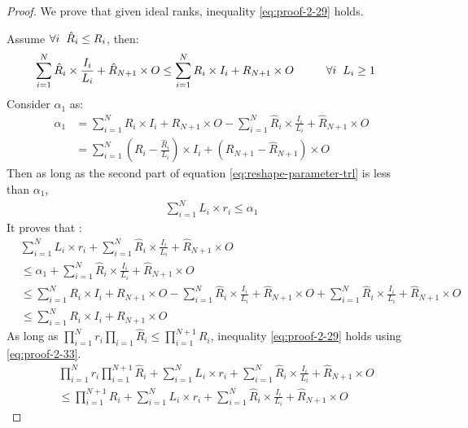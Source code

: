 \documentclass{article}
\begin{document}
\begin{proof}
	We prove that given ideal ranks, inequality \ref{eq:proof-2-29} holds. 
	
	Assume $\forall i \hspace{2mm}\hat{R}_i \leq R_i$, then:
	\begin{align}
		\label{eq:proof-2-30}
		\sum_{i=1}^{N} \hat{R}_i \times \frac{I_i}{L_i}  + \hat{R}_{N+1}\times O\leq \sum_{i=1}^{N}R_i\times I_i + R_{N+1}\times O \hspace{10mm}&  \forall i \hspace{2mm} L_i \geq 1
	\end{align}
	Consider $\alpha_1$ as:
	\begin{align}
		\label{eq:proof-2-31}
		\alpha_1 &= \sum_{i=1}^{N}R_i\times I_i + R_{N+1}\times O - \sum_{i=1}^{N} \hat{R}_i \times \frac{I_i}{L_i}  + \hat{R}_{N+1}\times O
		\nonumber\\
		&= \sum_{i=1}^{N}(R_i - \frac{\hat{R}_i}{L_i})\times I_i + (R_{N+1} - \hat{R}_{N+1})\times O
	\end{align}
	Then as long as the second part of equation \ref{eq:reshape-parameter-trl} is less than $\alpha_1$,
	\begin{align}
		\label{eq:proof-2-32}
		\sum_{i=1}^{N}L_i\times r_i \leq \alpha_1
	\end{align}
It proves that :
	\begin{align}
		\label{eq:proof-2-33}
		&\sum_{i=1}^{N}L_i\times r_i + \sum_{i=1}^{N} \hat{R}_i \times \frac{I_i}{L_i} + \hat{R}_{N+1}\times O 
		\nonumber\\
		&\leq
		\alpha_1 + \sum_{i=1}^{N} \hat{R}_i \times \frac{I_i}{L_i} + \hat{R}_{N+1}\times O 
		\nonumber\\
		&\leq
		\sum_{i=1}^{N}R_i\times I_i + R_{N+1}\times O - \sum_{i=1}^{N} \hat{R}_i \times \frac{I_i}{L_i}  + \hat{R}_{N+1}\times O
		+ \sum_{i=1}^{N} \hat{R}_i \times \frac{I_i}{L_i} + \hat{R}_{N+1}\times O 
		\nonumber\\
		&\leq
		\sum_{i=1}^{N} R_i\times I_i + R_{N+1}\times O 
	\end{align}
	As long as $\prod_{i=1}^{N}r_i \prod_{i=1}\hat{R}_i\leq
	\prod_{i=1}^{N+1}R_i$, inequality \ref{eq:proof-2-29} holds using \ref{eq:proof-2-33}.
	\begin{align}
		\label{eq:proof-2-34}
		&\prod_{i=1}^{N}r_i \prod_{i=1}^{N+1}\hat{R}_i + \sum_{i=1}^{N}L_i\times r_i + \sum_{i=1}^{N} \hat{R}_i \times \frac{I_i}{L_i} + \hat{R}_{N+1}\times O 
		\nonumber\\
		&\leq
		\prod_{i=1}^{N+1}R_i + \sum_{i=1}^{N}L_i\times r_i + \sum_{i=1}^{N} \hat{R}_i \times \frac{I_i}{L_i} + \hat{R}_{N+1}\times O

\end{align}
\end{proof}
\end{document}
